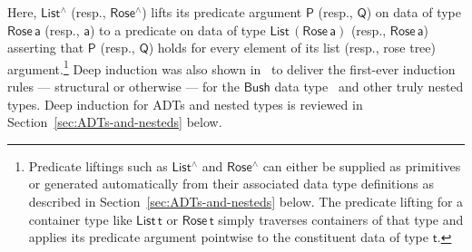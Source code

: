 \documentclass[9pt]{entcs}
\begin{document}
\noindent
Here, $\mathsf{List^\land}$ (resp., $\mathsf{Rose^\land}$) lifts its
predicate argument $\mathsf{P}$ (resp., $\mathsf{Q}$) on data of type
$\mathsf{Rose\,a}$ (resp., $\mathsf{a}$) to a predicate on data of
type $\mathsf{List\,(Rose\,a)}$ (resp., $\mathsf{Rose\,a}$) asserting
that $\mathsf{P}$ (resp., $\mathsf{Q}$) holds for every element of its
list (resp., rose tree) argument.\footnote{Predicate liftings such as
  $\mathsf{List^\land}$ and $\mathsf{Rose^\land}$ can either be
  supplied as primitives or generated automatically from their
  associated data type definitions as described in
  Section~\ref{sec:ADTs-and-nesteds} below. The predicate lifting for
  a container type like $\mathsf{List\,t}$ or $\mathsf{Rose\,t}$
  simply traverses containers of that type and applies its predicate
  argument pointwise to the constituent data of type $\mathsf{t}$.}
Deep induction was also shown in~\cite{jp20} to
deliver the first-ever induction rules --- structural or otherwise ---
for the $\mathsf{Bush}$ data type~\cite{bm98} and other truly nested
types. Deep induction for ADTs and nested types is reviewed in
Section~\ref{sec:ADTs-and-nesteds} below.
\end{document}
